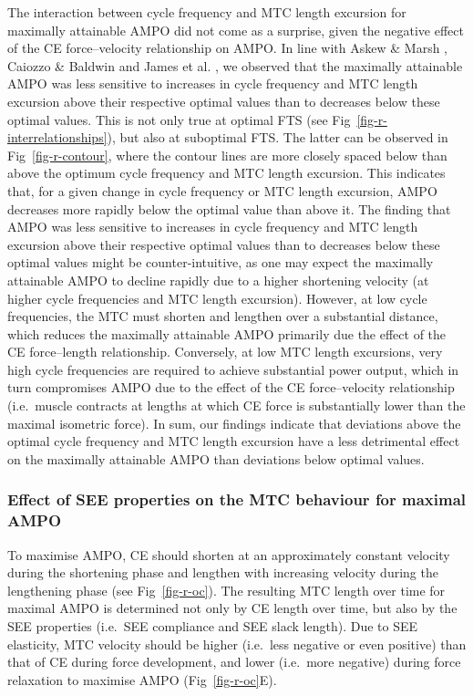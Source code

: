 \documentclass[
  10pt,
  letterpaper,
]{article}
\begin{document}
The interaction between cycle frequency and MTC length excursion for
maximally attainable AMPO did not come as a surprise, given the negative
effect of the CE force--velocity relationship on AMPO. In line with
{Askew \& Marsh \citep{askew_effects_1997}}, {Caiozzo \& Baldwin
\citep{caiozzo_determinants_1997}} and {James et al.
\citep{james_isometric_1996}}, we observed that the maximally attainable
AMPO was less sensitive to increases in cycle frequency and MTC length
excursion above their respective optimal values than to decreases below
these optimal values. This is not only true at optimal FTS (see
Fig~\ref{fig-r-interrelationships}), but also at suboptimal FTS. The
latter can be observed in Fig~\ref{fig-r-contour}, where the contour
lines are more closely spaced below than above the optimum cycle
frequency and MTC length excursion. This indicates that, for a given
change in cycle frequency or MTC length excursion, AMPO decreases more
rapidly below the optimal value than above it. The finding that AMPO was
less sensitive to increases in cycle frequency and MTC length excursion
above their respective optimal values than to decreases below these
optimal values might be counter-intuitive, as one may expect the
maximally attainable AMPO to decline rapidly due to a higher shortening
velocity (at higher cycle frequencies and MTC length excursion).
However, at low cycle frequencies, the MTC must shorten and lengthen
over a substantial distance, which reduces the maximally attainable AMPO
primarily due the effect of the CE force--length relationship.
Conversely, at low MTC length excursions, very high cycle frequencies
are required to achieve substantial power output, which in turn
compromises AMPO due to the effect of the CE force--velocity
relationship (i.e.~muscle contracts at lengths at which CE force is
substantially lower than the maximal isometric force). In sum, our
findings indicate that deviations above the optimal cycle frequency and
MTC length excursion have a less detrimental effect on the maximally
attainable AMPO than deviations below optimal values.

\subsubsection{Effect of SEE properties on the MTC behaviour for maximal
AMPO}\label{effect-of-see-properties-on-the-mtc-behaviour-for-maximal-ampo}

To maximise AMPO, CE should shorten at an approximately constant
velocity during the shortening phase and lengthen with increasing
velocity during the lengthening phase (see Fig~\ref{fig-r-oc}). The
resulting MTC length over time for maximal AMPO is determined not only
by CE length over time, but also by the SEE properties (i.e.~SEE
compliance and SEE slack length). Due to SEE elasticity, MTC velocity
should be higher (i.e.~less negative or even positive) than that of CE
during force development, and lower (i.e.~more negative) during force
relaxation to maximise AMPO (Fig~\ref{fig-r-oc}E).
\end{document}
